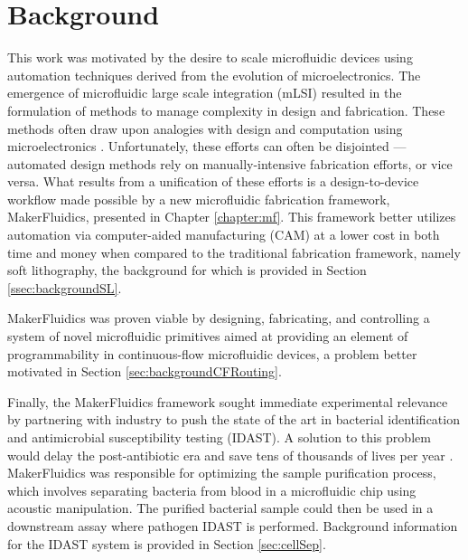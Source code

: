 \chapter{Background}
\label{chapter:background}
\thispagestyle{myheadings}

\graphicspath{{1a_background/Figures/}}

This work was motivated by the desire to scale microfluidic devices using automation techniques derived from the evolution of microelectronics. The emergence of microfluidic large scale integration (mLSI) resulted in the formulation of methods to manage complexity in design and fabrication. These methods often draw upon analogies with design and computation using microelectronics \cite{minhass2013}. Unfortunately, these efforts can often be disjointed --- automated design methods rely on manually-intensive fabrication efforts, or vice versa. What results from a unification of these efforts is a design-to-device workflow made possible by a new microfluidic fabrication framework, MakerFluidics, presented in Chapter \ref{chapter:mf}. This framework better utilizes automation via computer-aided manufacturing (CAM) at a lower cost in both time and money when compared to the traditional fabrication framework, namely soft lithography, the background for which is provided in Section \ref{ssec:backgroundSL}.

MakerFluidics was proven viable by designing, fabricating, and controlling a system of novel microfluidic primitives aimed at providing an element of programmability in continuous-flow microfluidic devices, a problem better motivated in Section \ref{sec:backgroundCFRouting}. 

Finally, the MakerFluidics framework sought immediate experimental relevance by partnering with industry to push the state of the art in bacterial identification and antimicrobial susceptibility testing (IDAST). A solution to this problem would delay the post-antibiotic era \cite{alanis2005resistance} and save tens of thousands of lives per year \cite{world2004world}. MakerFluidics was responsible for optimizing the sample purification process, which involves separating bacteria from blood in a microfluidic chip using acoustic manipulation. The purified bacterial sample could then be used in a downstream assay where pathogen IDAST is performed. Background information for the IDAST system is provided in Section \ref{sec:cellSep}.

